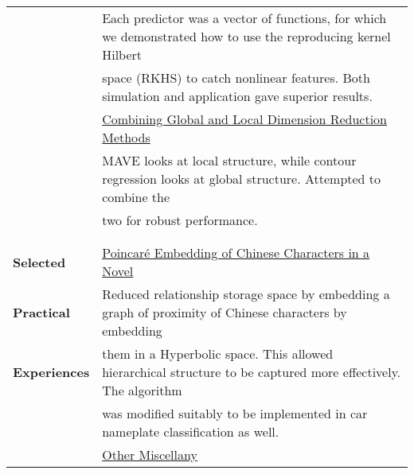 \documentclass[utf8,letterpaper,oneside]{article}
\begin{document}
\begin{center}
\begin{tabular}{l l}
                           & Each predictor was a vector of functions, for which we demonstrated how to use the reproducing kernel Hilbert                                    \\
                           & space (RKHS) to catch nonlinear features. Both simulation and application gave superior results.                                                 \\
                           & \underline{Combining Global and Local Dimension Reduction Methods}                                                                               \\
                           & MAVE looks at local structure, while contour regression looks at global structure. Attempted to combine the                                      \\
                           & two for robust performance.                                                                                                                      \\
                           &                                                                                                                                                  \\ \hline
                           &                                                                                                                                                  \\
  \textbf{Selected}        & \underline{Poincar\'e Embedding of Chinese Characters in a Novel}                                                                                \\
  \textbf{Practical}       & Reduced relationship storage space by embedding a graph of proximity of Chinese characters by embedding                                          \\
  \textbf{Experiences}     & them in a Hyperbolic space. This allowed hierarchical structure to be captured more effectively. The algorithm                                   \\
                           & was modified suitably to be implemented in car nameplate classification as well.                                                                 \\
                           & \underline{Other Miscellany}                                                                                                                     \\

\end{tabular}
\end{center}
\end{document}
